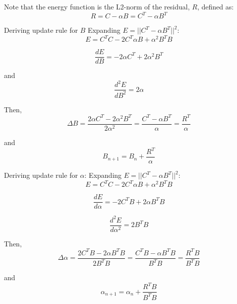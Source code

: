Note that the energy function is the L2-norm of the residual, $R$, defined as:
\begin{equation}
  R = C - \alpha B = C^T - \alpha B^T
\end{equation}

Deriving update rule for $B$
Expanding $E = ||C^T - \alpha B^T||^2$:
\begin{equation}
  E = C^TC - 2C^T\alpha B + \alpha^2 B^T B
\end{equation}

\begin{equation}
  \frac{dE}{dB} = -2\alpha C^T + 2\alpha^2 B^T
\end{equation}

and
\begin{equation}
  \frac{d^2E}{dB^2} = 2\alpha
\end{equation}

Then,
\begin{equation}
  \Delta B = \frac{2\alpha C^T - 2 \alpha^2 B^T}{2 \alpha^2} = \frac{C^T - \alpha B^T}{\alpha} = \frac{R^T}{\alpha}
\end{equation}

and
\begin{equation}
  B_{n+1} = B_n + \frac{R^T}{\alpha}
  \label{eq:binary_image_update}
\end{equation}

Deriving update rule for $\alpha$:
Expanding $E = ||C^T - \alpha B^T||^2$:
\begin{equation}
  E = C^TC - 2C^T\alpha B + \alpha^2 B^T B
\end{equation}

\begin{equation}
  \frac{dE}{d \alpha} = - 2 C^TB + 2 \alpha B^TB
\end{equation}

\begin{equation}
  \frac{d^2E}{d \alpha^2} = 2B^TB
\end{equation}

Then, 
\begin{equation}
  \Delta \alpha = \frac{2 C^TB - 2\alpha B^TB}{2 B^TB} = \frac{C^TB - \alpha B^TB}{B^TB} = \frac{R^TB}{B^TB}
\end{equation}

and
\begin{equation}
  \alpha_{n+1} = \alpha_n + \frac{R^TB}{B^TB}
  \label{eq:led_update}
\end{equation}

